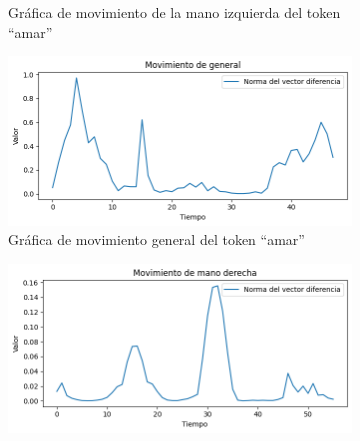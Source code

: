 \begin{figure}[t]
\begin{subfigure}[t]{0.3\textwidth}
		\caption{Gráfica de movimiento de la mano izquierda del token ``amar'' }
		\label{f:lhand_movediff_amar}
	\end{subfigure}
		\begin{subfigure}[t]{0.3\textwidth}
	\centering
		\includegraphics[align=t,width=0.9\linewidth, height =0.9\linewidth]{Graphics/amar_global_movediff_original_nu.png}
		\caption{Gráfica de movimiento general del token ``amar''}
		\label{f:general_movediff_amar}
	\end{subfigure}
	\vskip 0pt
	\begin{subfigure}[t]{0.3\textwidth}
	\centering
		\includegraphics[align=t,width=0.9\linewidth, height =0.9\linewidth]{Graphics/aborto_rhand_movediff_original_nu.png}

\end{subfigure}
\end{figure}
